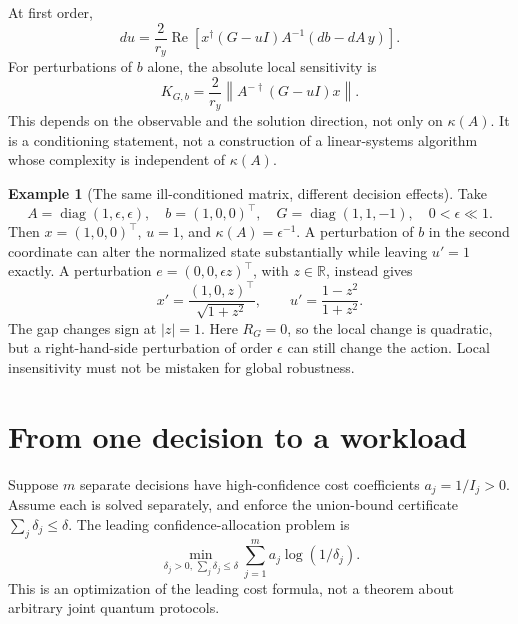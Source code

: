 \documentclass[11pt,a4paper]{article}
\newcommand{\R}{\mathbb R}
\newcommand{\diag}{\operatorname{diag}}
\theoremstyle{definition}
\newtheorem{example}[theorem]{Example}
\theoremstyle{remark}
\numberwithin{equation}{section}
\begin{document}
At first order,
\begin{equation}\label{eq:decisionderivative}
 du=\frac{2}{r_y}\operatorname{Re}
 \left[x^\dagger(G-uI)A^{-1}(db-dA\,y)\right].
\end{equation}
For perturbations of $b$ alone, the absolute local sensitivity is
\begin{equation}
 K_{G,b}=\frac{2}{r_y}
 \left\|A^{-\dagger}(G-uI)x\right\|.
\end{equation}
This depends on the observable and the solution direction, not only on
$\kappa(A)$. It is a conditioning statement, not a construction of a
linear-systems algorithm whose complexity is independent of $\kappa(A)$.

\begin{example}[The same ill-conditioned matrix, different decision effects]
Take
\begin{equation}
 A=\diag(1,\epsilon,\epsilon),\quad b=(1,0,0)^\top,\quad
 G=\diag(1,1,-1),\quad 0<\epsilon\ll1.
\end{equation}
Then $x=(1,0,0)^\top$, $u=1$, and $\kappa(A)=\epsilon^{-1}$.
A perturbation of $b$ in the second coordinate can alter the normalized
state substantially while leaving $u'=1$ exactly.
A perturbation $e=(0,0,\epsilon z)^\top$, with $z\in\R$, instead gives
\begin{equation}
 x'=\frac{(1,0,z)^\top}{\sqrt{1+z^2}},\qquad
 u'=\frac{1-z^2}{1+z^2}.
\end{equation}
The gap changes sign at $|z|=1$. Here $R_G=0$, so the local change is
quadratic, but a right-hand-side perturbation of order $\epsilon$ can still
change the action. Local insensitivity must not be mistaken for global
robustness.
\end{example}

\section{From one decision to a workload}\label{sec:workload}
Suppose $m$ separate decisions have high-confidence cost coefficients
$a_j=1/I_j>0$. Assume each is solved separately, and enforce the union-bound
certificate $\sum_j\delta_j\leq\delta$.
The leading confidence-allocation problem is
\begin{equation}\label{eq:confidenceallocation}
 \min_{\delta_j>0,\,\sum_j\delta_j\leq\delta}
 \sum_{j=1}^m a_j\log(1/\delta_j).
\end{equation}
This is an optimization of the leading cost formula, not a theorem about
arbitrary joint quantum protocols.
\end{document}
